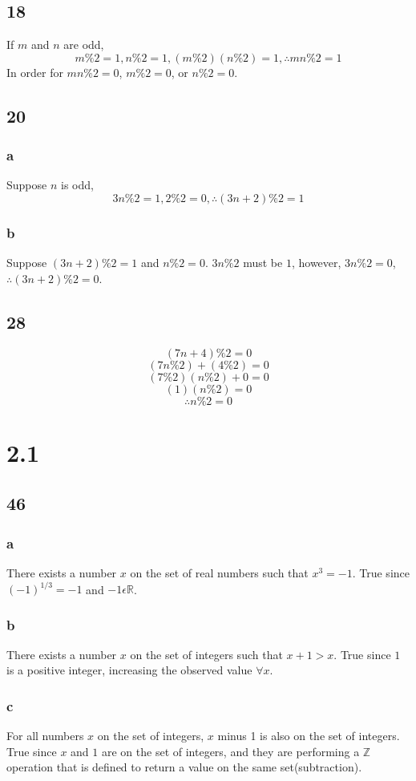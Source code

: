 \documentclass[journal]{IEEEtran}
\begin{document}
	\subsection*{18}
		If $m$ and $n$ are odd, 
		$$m\%2=1, n\%2=1, (m\%2)(n\%2)=1, \therefore mn\%2 = 1$$
		In order for $mn\%2=0$, $m\%2 = 0$, or $n\%2=0$.

	\subsection*{20}
	\subsubsection{a}
	Suppose $n$ is odd, 
	$$3n\%2 = 1, 2\%2=0, \therefore (3n+2)\%2=1$$

	\subsubsection{b}
	Suppose $(3n+2)\%2=1$ and $n\%2=0$. $3n\%2$ must be $1$, however, $3n\%2 = 0$, $\therefore (3n+2)\%2=0$.

	\subsection*{28}
	$$(7n+4)\%2=0$$
	$$(7n\%2)+(4\%2)=0$$
	$$(7\%2)(n\%2)+0=0$$
	$$(1)(n\%2)=0$$
	$$\therefore n\%2=0$$

\section*{2.1}
	\subsection*{46}
	\subsubsection{a}
	There exists a number $x$ on the set of real numbers such that $x^3 = -1$. True since $(-1)^{1/3} = -1$ and $-1 \epsilon \mathbb{R}$.

	\subsubsection{b}
	There exists a number $x$ on the set of integers such that $x+1 > x$. True since $1$ is a positive integer, 
	increasing the observed value $\forall x$.

	\subsubsection{c}
	For all numbers $x$ on the set of integers, $x$ minus 1 is also on the set of integers. True since 
	$x$ and $1$ are on the set of integers, and they are performing a $\mathbb{Z}$ operation that is defined to return
	a value on the same set(subtraction).
\end{document}

